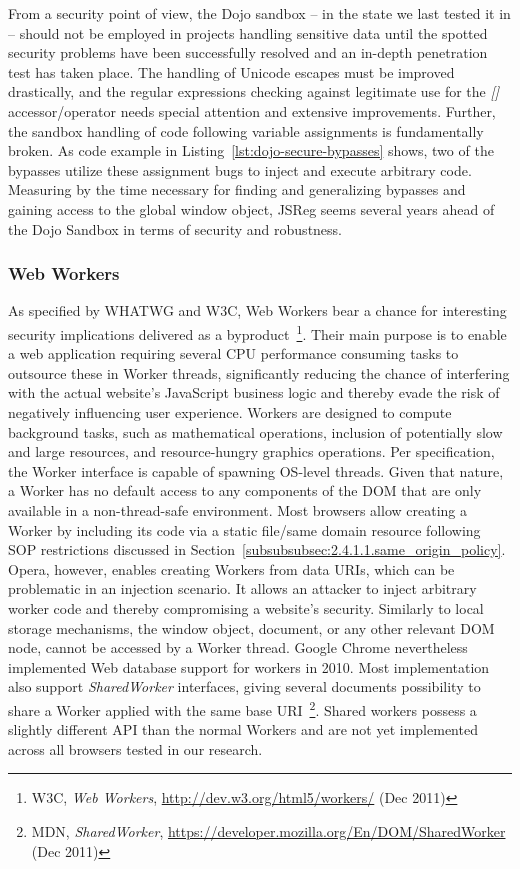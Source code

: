     From a security point of view, the Dojo sandbox -- in the state we last tested it in -- should not be employed in projects handling sensitive data until the spotted security problems have been successfully resolved and an in-depth penetration test has taken place. The handling of Unicode escapes must be improved drastically, and the regular expressions checking against legitimate use for the \textit{[]} accessor/operator needs special attention and extensive improvements. Further, the sandbox handling of code following variable assignments is fundamentally broken. As code example in Listing~\ref{lst:dojo-secure-bypasses} shows, two of the bypasses utilize these assignment bugs to inject and execute arbitrary code. Measuring by the time necessary for finding and generalizing bypasses and gaining access to the global window object, JSReg seems several years ahead of the Dojo Sandbox in terms of security and robustness.

    \subsubsection{Web Workers}
    \label{subsubsec:4.10.3.web_workers}

    As specified by WHATWG and W3C, Web Workers bear a chance for interesting security implications delivered as a byproduct~\footnote{W3C, \textit{Web Workers}, \url{http://dev.w3.org/html5/workers/} (Dec 2011)}. Their main purpose is to enable a web application requiring several CPU performance consuming tasks to outsource these in Worker threads, significantly reducing the chance of interfering with the actual website's JavaScript business logic and thereby evade the risk of negatively influencing user experience. Workers are designed to compute background tasks, such as mathematical operations, inclusion of potentially slow and large resources, and resource-hungry graphics operations. Per specification, the Worker interface is capable of spawning OS-level threads. Given that nature, a Worker has no default access to any components of the DOM that are only available in a non-thread-safe environment. Most browsers allow creating a Worker by including its code via a static file/same domain resource 
following SOP restrictions discussed in Section~\ref{subsubsubsec:2.4.1.1.same_origin_policy}. Opera, however, enables creating Workers from data URIs, which can be problematic in an injection scenario. It allows an attacker to inject arbitrary worker code and thereby compromising a website's security. Similarly to local storage mechanisms, the window object, document, or any other relevant DOM node, cannot be accessed by a Worker thread. Google Chrome nevertheless implemented Web database support for workers in 2010. Most implementation also support \textit{SharedWorker} interfaces, giving several documents possibility to share a Worker applied with the same base URI~\footnote{MDN, \textit{SharedWorker}, \url{https://developer.mozilla.org/En/DOM/SharedWorker} (Dec 2011)}. Shared workers possess a slightly different API than the normal Workers and are not yet implemented across all browsers tested in our research.\\

